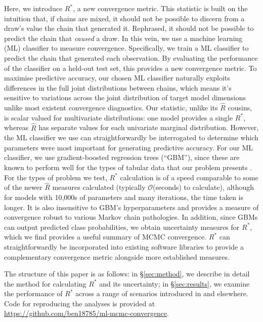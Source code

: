 \documentclass{article}
\begin{document}
Here, we introduce $R^*$, a new convergence metric. This statistic is built on the intuition that, if chains are mixed, it should not be possible to discern from a draw's value the chain that generated it. Rephrased, it should not be possible to predict the chain that \textit{caused} a draw. In this vein, we use a machine learning (ML) classifier to measure convergence. Specifically, we train a ML classifier to predict the chain that generated each observation. By evaluating the performance of the classifier on a held-out test set, this provides a new convergence metric. To maximise predictive accuracy, our chosen ML classifier naturally exploits differences in the full joint distributions between chains, which means it's sensitive to variations across the joint distribution of target model dimensions unlike most existent convergence diagnostics. Our statistic, unlike its $\widehat{R}$ cousins, is scalar valued for multivariate distributions: one model provides a single $R^*$, whereas $\widehat{R}$ has separate values for each univariate marginal distribution. However, the ML classifier we use can straightforwardly be interrogated to determine which parameters were most important for generating predictive accuracy. For our ML classifier, we use gradient-boosted regression trees \citep{friedman2001greedy,greenwell2019package} (``GBM''), since these are known to perform well for the types of tabular data that our problem presents \citep{chollet2018}. For the types of problem we test, $R^*$ calculation is of a speed comparable to some of the newer $\widehat{R}$ measures calculated (typically $\mathcal{O}$(seconds) to calculate), although for models with 10,000s of parameters and many iterations, the time taken is longer. It is also insensitive to GBM's hyperparameters and provides a measure of convergence robust to various Markov chain pathologies. In addition, since GBMs can output predicted class probabilities, we obtain uncertainty measures for $R^*$, which we find provides a useful summary of MCMC convergence. $R^*$ can straightforwardly be incorporated into existing software libraries to provide a complementary convergence metric alongside more established measures.

The structure of this paper is as follows: in \S\ref{sec:method}, we describe in detail the method for calculating $R^*$ and its uncertainty; in \S\ref{sec:results}, we examine the performance of $R^*$ across a range of scenarios introduced in \cite{vehtari2019rank} and elsewhere. Code for reproducing the analyses is provided at \url{https://github.com/ben18785/ml-mcmc-convergence}.
\end{document}
